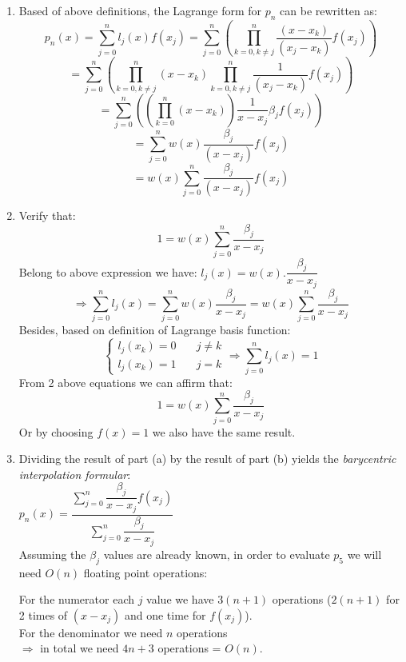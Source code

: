 \documentclass[14pt,a4paper]{article}
\begin{document}
	\begin{enumerate}
		\item Based of above definitions, the Lagrange form for $p_n$ can be rewritten as:
		 $$p_n(x) = \sum_{j=0}^{n}l_j(x)f(x_j) = \sum_{j=0}^n \left( \prod_{k=0, k \neq j}^{n}\dfrac{(x-x_k)}{(x_j-x_k)} f(x_j)\right) $$ 
		 \hspace*{4cm} $$ = \sum_{j=0}^n \left( \prod_{k=0, k \neq j}^{n}(x-x_k) \prod_{k=0, k \neq j}^{n}\dfrac{1}{(x_j-x_k)}f(x_j) \right)$$
		 \hspace*{4cm} $$ = \sum_{j=0}^n \left(\left( \prod_{k=0}^{n}(x-x_k) \right) \dfrac{1}{x-x_j}\beta_jf(x_j) \right)$$
		 \hspace{4cm} $$ = \sum_{j=0}^n w(x) \dfrac{\beta_j}{(x-x_j)}f(x_j) $$
		 \hspace{4cm} $$ = w(x)\sum_{j=0}^n  \dfrac{\beta_j}{(x-x_j)}f(x_j) $$
		
		
		\item Verify that: \hspace{1cm} $$ 1 = w(x)\sum_{j=0}^{n} \dfrac{\beta_j}{x-x_j}$$
		Belong to above expression we have: $l_j(x) = w(x).\dfrac{\beta_j}{x-x_j}$
		$$ \Rightarrow \sum_{j=0}^{n}l_j(x) = \sum_{j=0}^{n} w(x)\dfrac{\beta_j}{x-x_j} = w(x) \sum_{j=0}^{n}\dfrac{\beta_j}{x-x_j}$$
		Besides, based on definition of Lagrange basis function: $$\begin{cases} l_j(x_k) = 0 & \quad j \neq k \\ l_j(x_k) = 1 & \quad j = k \end{cases} \Rightarrow \sum_{j=0}^{n} l_j(x) = 1$$ 
		From 2 above equations we can affirm that: $$ 1 = w(x)\sum_{j=0}^{n} \dfrac{\beta_j}{x-x_j}$$
		Or by choosing $f(x) = 1$ we also have the same result.
		
		\item Dividing the result of part (a) by the result of part (b) yields the \textit{barycentric interpolation formular}:\\
		\hspace*{2cm} $ p_n(x) = \dfrac{\sum_{j=0}^{n}\dfrac{\beta_j}{x-x_j}f(x_j)}{\sum_{j=0}^{n}\dfrac{\beta_j}{x-x_j}} $ \\
		Assuming the $\beta_j$ values are already known, in order to evaluate $p_5$ we will need $O(n)$ floating point operations:
		
		For the numerator each $j$ value we have $3(n+1)$ operations ($2(n+1)$ for 2 times of $(x-x_j)$ and one time for $f(x_j)$). \\
			For the denominator we need $n$ operations\\ 
			$\Rightarrow$ in total we need $4n + 3$ operations = $O(n)$. 
						

\end{enumerate}
\end{document}
